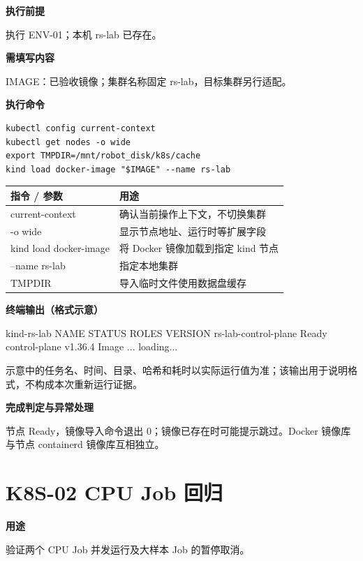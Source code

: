\documentclass[UTF8,a4paper,11pt,oneside,fontset=none]{ctexrep}
\begin{document}
\par\noindent\textbf{执行前提}\par
执行 ENV-01；本机 rs-lab 已存在。

\par\noindent\textbf{需填写内容}\par
IMAGE：已验收镜像；集群名称固定 rs-lab，目标集群另行适配。

\par\noindent\textbf{执行命令}\par
\begin{Verbatim}
kubectl config current-context
kubectl get nodes -o wide
export TMPDIR=/mnt/robot_disk/k8s/cache
kind load docker-image "$IMAGE" --name rs-lab
\end{Verbatim}
\begin{center}\small
\begin{tabular}{>{\raggedright\arraybackslash}p{5.62cm}>{\raggedright\arraybackslash}p{9.98cm}}
\toprule
\textbf{指令 / 参数} & \textbf{用途} \\ \midrule
current-context & 确认当前操作上下文，不切换集群 \\
-o wide & 显示节点地址、运行时等扩展字段 \\
kind load docker-image & 将 Docker 镜像加载到指定 kind 节点 \\
--name rs-lab & 指定本地集群 \\
TMPDIR & 导入临时文件使用数据盘缓存 \\
\bottomrule
\end{tabular}
\end{center}
\par\noindent\textbf{终端输出（格式示意）}\par
\begin{TerminalOutput}
kind-rs-lab
NAME                   STATUS   ROLES           VERSION
rs-lab-control-plane   Ready    control-plane   v1.36.4
Image ... loading...
\end{TerminalOutput}
示意中的任务名、时间、目录、哈希和耗时以实际运行值为准；该输出用于说明格式，不构成本次重新运行证据。

\par\noindent\textbf{完成判定与异常处理}\par
节点 Ready，镜像导入命令退出 0；镜像已存在时可能提示跳过。Docker 镜像库与节点 containerd 镜像库互相独立。

\section{K8S-02 CPU Job 回归}
\par\noindent\textbf{用途}\par
验证两个 CPU Job 并发运行及大样本 Job 的暂停取消。
\end{document}
